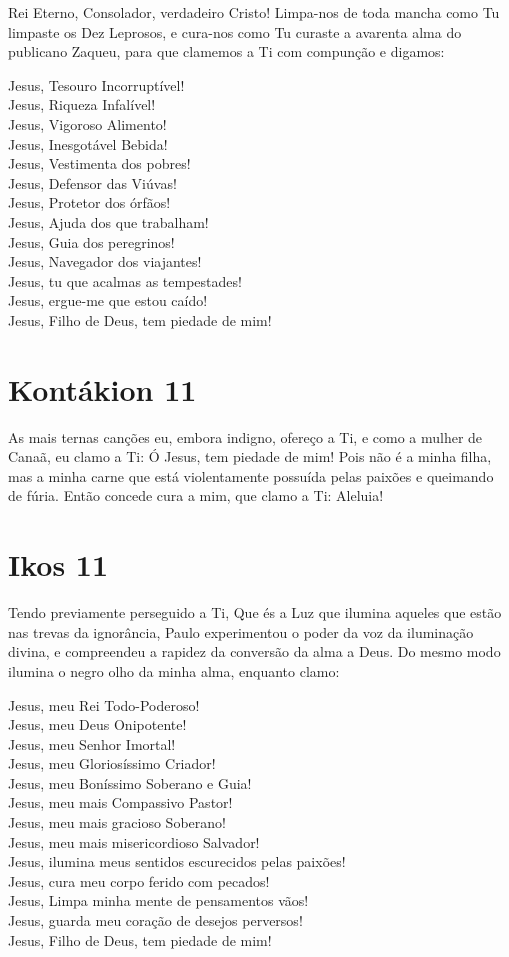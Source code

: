 \documentclass{subfiles}
\begin{document}
Rei Eterno, Consolador, verdadeiro Cristo! Limpa-nos de toda mancha
como Tu limpaste os Dez Leprosos, e cura-nos como Tu curaste a avarenta
alma do publicano Zaqueu, para que clamemos a Ti com compunção e
digamos:

Jesus, Tesouro Incorruptível! \\
Jesus, Riqueza Infalível! \\
Jesus, Vigoroso Alimento! \\
Jesus, Inesgotável Bebida! \\
Jesus, Vestimenta dos pobres! \\
Jesus, Defensor das Viúvas! \\
Jesus, Protetor dos órfãos! \\
Jesus, Ajuda dos que trabalham! \\
Jesus, Guia dos peregrinos! \\
Jesus, Navegador dos viajantes! \\
Jesus, tu que acalmas as tempestades! \\
Jesus, ergue-me que estou caído! \\
Jesus, Filho de Deus, tem piedade de mim!

\section{Kontákion 11}

As mais ternas canções eu, embora indigno, ofereço a Ti, e como a
mulher de Canaã, eu clamo a Ti: Ó Jesus, tem piedade de mim! Pois não é a
minha filha, mas a minha carne que está violentamente possuída pelas paixões
e queimando de fúria. Então concede cura a mim, que clamo a Ti: Aleluia!

\section{Ikos 11}

Tendo previamente perseguido a Ti, Que és a Luz que ilumina aqueles
que estão nas trevas da ignorância, Paulo experimentou o poder da voz da
iluminação divina, e compreendeu a rapidez da conversão da alma a Deus. Do
mesmo modo ilumina o negro olho da minha alma, enquanto clamo:

Jesus, meu Rei Todo-Poderoso! \\
Jesus, meu Deus Onipotente! \\
Jesus, meu Senhor Imortal! \\
Jesus, meu Gloriosíssimo Criador! \\
Jesus, meu Boníssimo Soberano e Guia! \\
Jesus, meu mais Compassivo Pastor! \\
Jesus, meu mais gracioso Soberano! \\
Jesus, meu mais misericordioso Salvador! \\
Jesus, ilumina meus sentidos escurecidos pelas paixões! \\
Jesus, cura meu corpo ferido com pecados! \\
Jesus, Limpa minha mente de pensamentos vãos! \\
Jesus, guarda meu coração de desejos perversos! \\
Jesus, Filho de Deus, tem piedade de mim!
\end{document}
